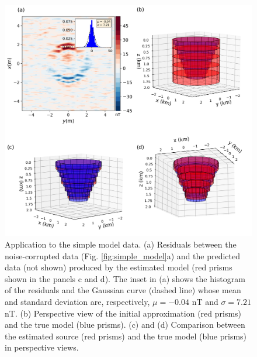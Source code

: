 \begin{figure}
	\centering
	\includegraphics[width=\linewidth]{figures/simple_results.png}
	\caption{Application to the simple model data. (a) Residuals between the  noise-corrupted data (Fig. \ref{fig:simple_model}a) and the predicted data (not shown) produced by the estimated model (red prisms shown in the panels c and d). The inset in (a) shows the histogram of the residuals and the Gaussian curve (dashed line) whose mean and standard deviation are, respectively, $\mu = -0.04$ nT and $\sigma=7.21$ nT. (b) Perspective view of the initial approximation (red prisms) and the true model (blue prisms). (c) and (d) Comparison between the estimated source (red prisms) and the true model (blue prisms) in perspective views.}
	\label{fig:simple_results}
\end{figure}


